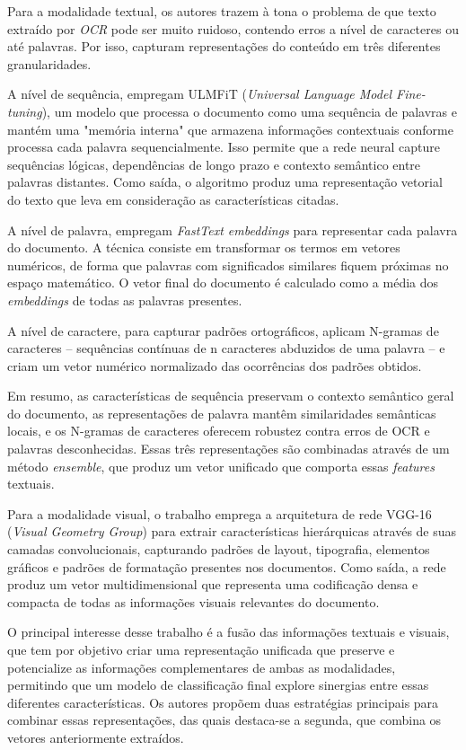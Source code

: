 Para a modalidade textual, os autores trazem à tona o problema de que texto extraído por \textit{OCR} pode ser muito ruidoso, contendo erros a nível de caracteres ou até palavras. Por isso, capturam representações do conteúdo em três diferentes granularidades. 

A nível de sequência, empregam ULMFiT (\textit{Universal Language Model Fine-tuning}), um modelo que processa o documento como uma sequência de palavras e mantém uma "memória interna" que armazena informações contextuais conforme processa cada palavra sequencialmente. Isso permite que a rede neural capture sequências lógicas, dependências de longo prazo e contexto semântico entre palavras distantes. Como saída, o algoritmo produz uma representação vetorial do texto que leva em consideração as características citadas.

A nível de palavra, empregam \textit{FastText embeddings} para representar cada palavra do documento. A técnica consiste em transformar os termos em vetores numéricos, de forma que palavras com significados similares fiquem próximas no espaço matemático. O vetor final do documento é calculado como a média dos \textit{embeddings} de todas as palavras presentes.

A nível de caractere, para capturar padrões ortográficos, aplicam N-gramas de caracteres -- sequências contínuas de n caracteres abduzidos de uma palavra -- e criam um vetor numérico normalizado das ocorrências dos padrões obtidos.

Em resumo, as características de sequência preservam o contexto semântico geral do documento, as representações de palavra mantêm similaridades semânticas locais, e os N-gramas de caracteres oferecem robustez contra erros de OCR e palavras desconhecidas. Essas três representações são combinadas através de um método \textit{ensemble}, que produz um vetor unificado que comporta essas \textit{features} textuais.

Para a modalidade visual, o trabalho emprega a arquitetura de rede VGG-16 (\textit{Visual Geometry Group}) para extrair características hierárquicas através de suas camadas convolucionais, capturando padrões de layout, tipografia, elementos gráficos e padrões de formatação presentes nos documentos. Como saída, a rede produz um vetor multidimensional que representa uma codificação densa e compacta de todas as informações visuais relevantes do documento.

O principal interesse desse trabalho é a fusão das informações textuais e visuais, que tem por objetivo criar uma representação unificada que preserve e potencialize as informações complementares de ambas as modalidades, permitindo que um modelo de classificação final explore sinergias entre essas diferentes características. Os autores propõem duas estratégias principais para combinar essas representações, das quais destaca-se a segunda, que combina os vetores anteriormente extraídos.

